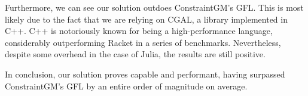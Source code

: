 Furthermore, we can see our solution outdoes ConstraintGM's \ac{GFL}.  This is
most likely due to the fact that we are relying on \ac{CGAL}, a library
implemented in C++.  C++ is notoriously known for being a high-performance
language, considerably outperforming Racket in a series of benchmarks.
Nevertheless, despite some overhead in the case of Julia, the results are still
positive.

In conclusion, our solution proves capable and performant, having surpassed
ConstraintGM's \ac{GFL} by an entire order of magnitude on average.
